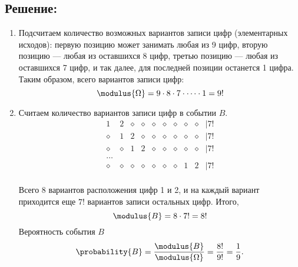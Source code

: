 \subsection*{Решение:}
\begin{enumerate}
    \item
    Подсчитаем количество возможных вариантов записи цифр (элементарных исходов): первую позицию может занимать любая из 9 цифр, вторую позицию --- любая из оставшихся 8 цифр,
    третью позицию --- любая из оставшихся 7 цифр, и так далее, для последней позиции останется 1 цифра. Таким образом, всего вариантов записи цифр:
    \begin{equation}
        \modulus{\Omega} = 9 \cdot 8 \cdot 7 \cdot \dots \cdot 1 = 9!
    \end{equation}

    \item
    Считаем количество вариантов записи цифр в событии $B$.
    \begin{equation}
        \begin{array}{ccccccccccr}
            1        & 2        & \diamond & \diamond & \diamond & \diamond & \diamond & \diamond & \diamond & | 7! \\
            \diamond & 1        & 2        & \diamond & \diamond & \diamond & \diamond & \diamond & \diamond & | 7! \\
            \diamond & \diamond & 1        & 2        & \diamond & \diamond & \diamond & \diamond & \diamond & | 7! \\
            \dots    &          &          &          &          &          &          &          &          &      \\
            \diamond & \diamond & \diamond & \diamond & \diamond & \diamond & \diamond & 1        & 2        & | 7! \\
        \end{array}
    \end{equation}

    Всего 8 вариантов расположения цифр 1 и 2, и на каждый вариант приходится еще $7!$ вариантов записи остальных цифр. Итого,
    \begin{equation}
        \modulus{B} = 8 \cdot 7! = 8!
    \end{equation}
    Вероятность события $B$
    \begin{equation}
        \probability{B} = \frac{\modulus{B}}{\modulus{\Omega}} = \frac{8!}{9!} = \frac{1}{9} .
    \end{equation}


\end{enumerate}
